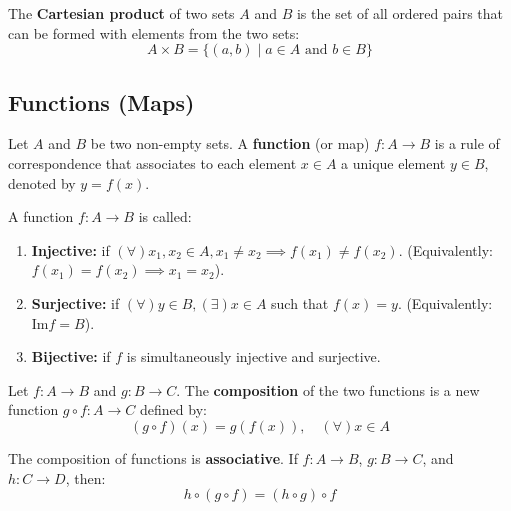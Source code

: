 \begin{definition}
The \textbf{Cartesian product} of two sets $A$ and $B$ is the set of all ordered pairs that can be formed with elements from the two sets:
$$ A \times B = \{(a, b) \mid a \in A \text{ and } b \in B\} $$
\end{definition}

\subsection*{Functions (Maps)}

\begin{definition}
Let $A$ and $B$ be two non-empty sets. A \textbf{function} (or map) $f: A \to B$ is a rule of correspondence that associates to each element $x \in A$ a unique element $y \in B$, denoted by $y = f(x)$. 
\end{definition}

\begin{definition}\leavevmode
A function $f: A \to B$ is called:
\begin{enumerate}
    \item \textbf{Injective:} if $(\forall) x_1, x_2 \in A, x_1 \neq x_2 \implies f(x_1) \neq f(x_2)$. (Equivalently: $f(x_1) = f(x_2) \implies x_1 = x_2$).
    \item \textbf{Surjective:} if $(\forall) y \in B, (\exists) x \in A$ such that $f(x) = y$. (Equivalently: $\text{Im} f = B$).
    \item \textbf{Bijective:} if $f$ is simultaneously injective and surjective.
\end{enumerate}
\end{definition}

\begin{definition}
Let $f: A \to B$ and $g: B \to C$. The \textbf{composition} of the two functions is a new function $g \circ f: A \to C$ defined by:
$$ (g \circ f)(x) = g(f(x)), \quad (\forall) x \in A $$
\end{definition}

\begin{proposition}
The composition of functions is \textbf{associative}. If $f: A \to B$, $g: B \to C$, and $h: C \to D$, then:
$$ h \circ (g \circ f) = (h \circ g) \circ f $$
\end{proposition}